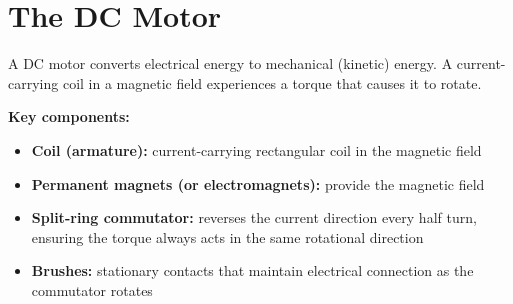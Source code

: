 \section{The DC Motor}

\begin{processbox}
A DC motor converts electrical energy to mechanical
(kinetic) energy. A current-carrying coil in a
magnetic field experiences a torque that causes it
to rotate.

\textbf{Key components:}
\begin{itemize}[noitemsep]
  \item \textbf{Coil (armature):} current-carrying
  rectangular coil in the magnetic field
  \item \textbf{Permanent magnets (or electromagnets):}
  provide the magnetic field
  \item \textbf{Split-ring commutator:} reverses
  the current direction every half turn, ensuring
  the torque always acts in the same rotational
  direction
  \item \textbf{Brushes:} stationary contacts that
  maintain electrical connection as the commutator
  rotates
\end{itemize}
\end{processbox}


